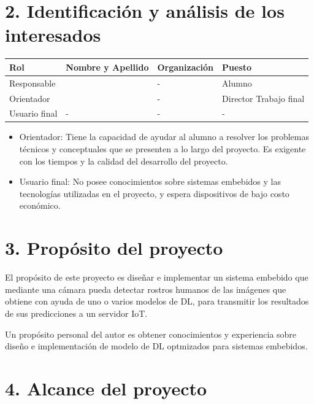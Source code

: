 \documentclass[
11pt, %
]{plan}
\begin{document}
\section{2. Identificación y análisis de los interesados}
\label{sec:interesados}

\begin{table}[ht]
\begin{tabularx}{\linewidth}{@{}|l|X|X|l|@{}}
\hline
\rowcolor[HTML]{C0C0C0}
Rol           & Nombre y Apellido & Organización 			& Puesto 	\\ \hline
Responsable   & \authorname		& -        				& Alumno 	\\ \hline
Orientador    & \supname			& - 						& Director Trabajo final \\ \hline
Usuario final & -                 & -             			& -       	\\ \hline
\end{tabularx}
\end{table}

\begin{itemize}
	\item Orientador: Tiene la capacidad de ayudar al alumno a resolver los problemas técnicos y conceptuales que se presenten a lo largo del proyecto. Es exigente con los tiempos y la calidad del desarrollo del proyecto.
	\item Usuario final: No posee conocimientos sobre sistemas embebidos y las tecnologías utilizadas en el proyecto, y espera dispositivos de bajo costo económico.
\end{itemize}



\section{3. Propósito del proyecto}
\label{sec:proposito}

El propósito de este proyecto es diseñar e implementar un sistema embebido que mediante una cámara pueda detectar rostros humanos de las imágenes que obtiene con ayuda de uno o varios modelos de DL, para transmitir los resultados de sus predicciones a un servidor IoT.

Un propósito personal del autor es obtener conocimientos y experiencia sobre diseño e implementación de modelo de DL optmizados para sistemas embebidos.

\section{4. Alcance del proyecto}
\label{sec:alcance}
\end{document}
